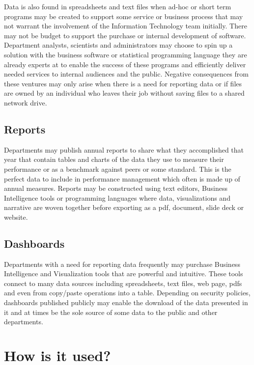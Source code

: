 \documentclass[
  openany]{book}
\begin{document}
Data is also found in spreadsheets and text files when ad-hoc or short term programs may be created to support some service or business process that may not warrant the involvement of the Information Technology team initially. There may not be budget to support the purchase or internal development of software. Department analysts, scientists and administrators may choose to spin up a solution with the business software or statistical programming language they are already experts at to enable the success of these programs and efficiently deliver needed services to internal audiences and the public. Negative consequences from these ventures may only arise when there is a need for reporting data or if files are owned by an individual who leaves their job without saving files to a shared network drive.

\hypertarget{reports}{%
\subsection{Reports}\label{reports}}

Departments may publish annual reports to share what they accomplished that year that contain tables and charts of the data they use to measure their performance or as a benchmark against peers or some standard. This is the perfect data to include in performance management which often is made up of annual measures. Reports may be constructed using text editors, Business Intelligence tools or programming languages where data, visualizations and narrative are woven together before exporting as a pdf, document, slide deck or website.

\hypertarget{dashboards}{%
\subsection{Dashboards}\label{dashboards}}

Departments with a need for reporting data frequently may purchase Business Intelligence and Visualization tools that are powerful and intuitive. These tools connect to many data sources including spreadsheets, text files, web page, pdfs and even from copy/paste operations into a table. Depending on security policies, dashboards published publicly may enable the download of the data presented in it and at times be the sole source of some data to the public and other departments.

\hypertarget{how-is-it-used}{%
\section{How is it used?}\label{how-is-it-used}}
\end{document}
